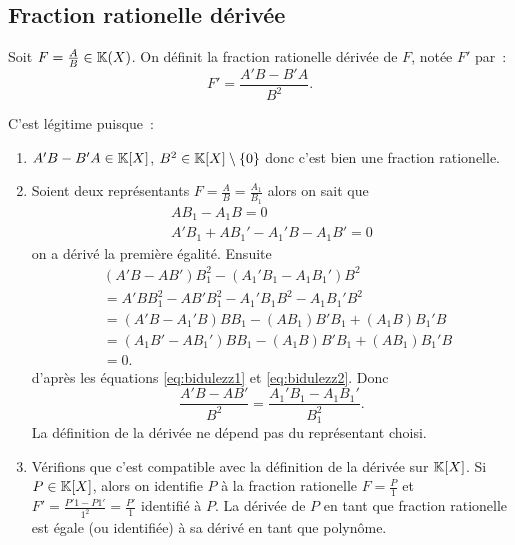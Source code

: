 \subsection{Fraction rationelle dérivée}

\begin{defdef}
  Soit \(F=\frac{A}{B}\in\mathbb{K}(X)\). On définit la fraction rationelle dérivée de \(F\), notée \(F'\) par~:
  \begin{equation}
    F' = \frac{A'B-B'A}{B^2}.
  \end{equation}
\end{defdef}
C'est légitime puisque~:
\begin{enumerate}
\item \(A'B-B'A \in \mathbb{K}[X]\), \(B^2 \in \mathbb{K}[X] \setminus\{0\}\) donc c'est bien une fraction rationelle.
\item Soient deux représentants \(F=\frac{A}{B}=\frac{A_1}{B_1}\) alors on sait que
  \begin{align}
    AB_1-A_1B = 0 \label{eq:bidulezz1}\\
    A'B_1 +AB_1' - A_1'B-A_1B'=0\label{eq:bidulezz2}
  \end{align}
  on a dérivé la première égalité. Ensuite
  \begin{align}
    &(A'B-AB')B_1^{2}-(A_1'B_1-A_1B_1')B^2\\
    &=A'BB_1^{2} - AB'B_1^{2} - A_1'B_1B^{2} -A_1B_1'B^{2} \\
    &=(A'B-A_1'B)BB_1 - (AB_1)B'B_1 +(A_1B)B_1'B\\
    &=(A_1B'-AB_1')BB_1 - (A_1B)B'B_1 +(AB_1)B_1'B\\
    &=0.
  \end{align}
  d'après les équations \eqref{eq:bidulezz1} et \eqref{eq:bidulezz2}. Donc
  \begin{equation}
    \frac{A'B-AB'}{B^2}=\frac{A_1'B_1-A_1B_1'}{B_1^{2}}.
  \end{equation}
  La définition de la dérivée ne dépend pas du représentant choisi.
\item Vérifions que c'est compatible avec la définition de la dérivée sur \(\mathbb{K}[X]\). Si \(P\in\mathbb{K}[X]\), alors on identifie \(P\) à la fraction rationelle \(F=\frac{P}{1}\) et \(F'=\frac{P'1-P1'}{1^2}=\frac{P'}{1}\) identifié à \(P\). La dérivée de \(P\) en tant que fraction rationelle est égale (ou identifiée) à sa dérivé en tant que polynôme.
\end{enumerate}

